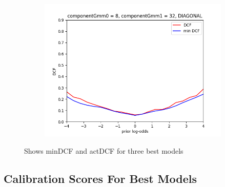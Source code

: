 \begin{figure}[h!]
\begin{subfigure}[b]{0.30\linewidth}
        \includegraphics[width=\linewidth]{Lab/11. Lab 11/Images/BestConfiguration/03. GMM}
        \label{fig:GMM}
    \end{subfigure}
    \caption{Shows minDCF and actDCF for three best models}
    \label{fig:BestConfiguration}
\end{figure}

\subsection{Calibration Scores For Best Models}
\label{subsec:calibrationScores}

